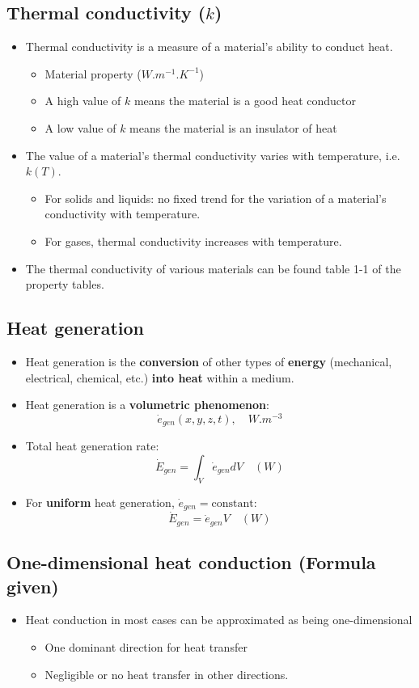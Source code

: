 \documentclass[11pt]{article}
\begin{document}
\subsection{Thermal conductivity (\(k\))}
\label{sec:org82e370f}
\begin{itemize}
\item Thermal conductivity is a measure of a material's ability to conduct heat.
\begin{itemize}
\item Material property (\(\unit{W.m^{-1}.K^{-1}}\))
\item A high value of \(k\) means the material is a good heat conductor
\item A low value of \(k\) means the material is an insulator of heat
\end{itemize}
\item The value of a material's thermal conductivity varies with temperature, i.e. \(k(T)\).
\begin{itemize}
\item For solids and liquids: no fixed trend for the variation of a material's conductivity with temperature.
\item For gases, thermal conductivity increases with temperature.
\end{itemize}
\item The thermal conductivity of various materials can be found table 1-1 of the property tables.
\end{itemize}
\subsection{Heat generation}
\label{sec:orgab79406}
\begin{itemize}
\item Heat generation is the \textbf{conversion} of other types of \textbf{energy} (mechanical, electrical, chemical, etc.) \textbf{into heat} within a medium.
\item Heat generation is a \textbf{volumetric phenomenon}:
\[\dot{e}_{gen} (x, y, z, t), \quad \unit{W.m^{-3}}\]
\item Total heat generation rate:
\[\dot{E}_{gen} = \int_V \dot{e}_{gen} dV \quad (\unit{W})\]
\item For \textbf{uniform} heat generation, \(\dot{e}_{gen} = \text{constant}\):
\[\dot{E}_{gen} = \dot{e}_{gen} V \quad (\unit{W})\]
\end{itemize}
\subsection{One-dimensional heat conduction (Formula given)}
\label{sec:orgc3ebcd6}
\begin{itemize}
\item Heat conduction in most cases can be approximated as being one-dimensional
\begin{itemize}
\item One dominant direction for heat transfer
\item Negligible or no heat transfer in other directions.
\end{itemize}
\end{itemize}
\end{document}

